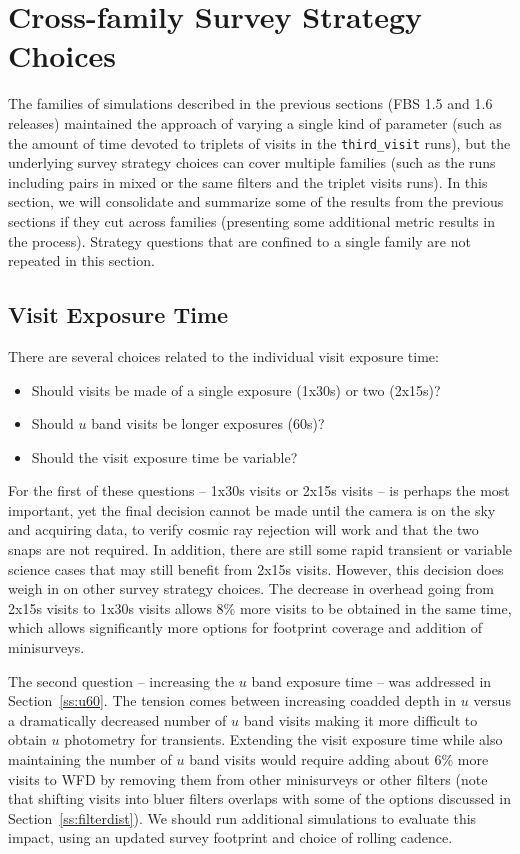 \section{Cross-family Survey Strategy Choices}

The families of simulations described in the previous sections (FBS 1.5 and 1.6 releases) maintained the approach of varying a single kind of parameter (such as the amount of time devoted to triplets of visits in the {\tt third\_visit} runs), but the underlying survey strategy choices can cover multiple families (such as the runs including pairs in mixed or the same filters and the triplet visits runs). In this section, we will consolidate and summarize some of the results from the previous sections if they cut across families (presenting some additional metric results in the process). Strategy questions that are confined to a single family are not repeated in this section.

\subsection{Visit Exposure Time}\label{sec:visitexposuretime}

There are several choices related to the individual visit exposure time:
 \begin{itemize}
 \item Should visits be made of a single exposure (1x30s) or two (2x15s)? 
 \item Should $u$ band visits be longer exposures (60s)?
 \item Should the visit exposure time be variable?
 \end{itemize}
 
For the first of these questions -- 1x30s visits or 2x15s visits -- is perhaps the most important, yet the final decision cannot be made until the camera is on the sky and acquiring data, to verify cosmic ray rejection will work and that the two snaps are not required. In addition, there are still some rapid transient or variable science cases that may still benefit from 2x15s visits. However, this decision does weigh in on other survey strategy choices. The decrease in overhead going from 2x15s visits to 1x30s visits allows 8\% more visits to be obtained in the same time, which allows significantly more options for footprint coverage and addition of minisurveys. 

The second question -- increasing the $u$ band exposure time -- was addressed in Section~\ref{ss:u60}. The tension comes between increasing coadded depth in $u$ versus a dramatically decreased number of $u$ band visits making it more difficult to obtain $u$ photometry for transients. Extending the visit exposure time while also maintaining the number of $u$ band visits would require adding about 6\% more visits to WFD by removing them from other minisurveys or other filters (note that shifting visits into bluer filters overlaps with some of the options discussed in Section~\ref{ss:filterdist}). We should run additional simulations to evaluate this impact, using an updated survey footprint and choice of rolling cadence. 


